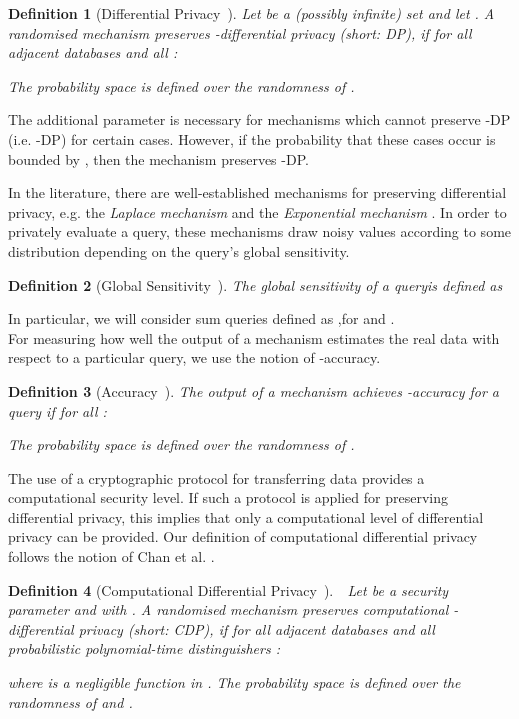 \documentclass[10pt]{extarticle}
\newtheorem{Def}{Definition}
\begin{document}
\begin{Def}[Differential Privacy~\cite{8}]
Let  be a (possibly infinite) set and let . A randomised mechanism  preserves -differential privacy (short: \mbox{\upshape\sffamily DP}), if for all adjacent databases  and all :

The probability space is defined over the randomness of .
\end{Def}

The additional parameter  is necessary for mechanisms which cannot preserve -\mbox{\upshape\sffamily DP} (i.e. -\mbox{\upshape\sffamily DP}) for certain cases. However, if the probability that these cases occur is bounded by , then the mechanism preserves -\mbox{\upshape\sffamily DP}.

In the literature, there are well-established mechanisms for preserving differential privacy, e.g. the \textit{Laplace mechanism} \cite{8} and the \textit{Exponential mechanism} \cite{9}. In order to privately evaluate a query, these mechanisms draw noisy values according to some distribution depending on the query's global sensitivity.


\begin{Def}[Global Sensitivity~\cite{8}]
The global sensitivity  of a query\linebreak  is defined as

\end{Def}

In particular, we will consider sum queries  defined as ,\linebreak for  and .\\
For measuring how well the output of a mechanism estimates the real data with respect to a particular query, we use the notion of -accuracy.

\begin{Def}[Accuracy~\cite{17}]
The output of a mechanism  achieves -accuracy for a query  if for all :

The probability space is defined over the randomness of .
\end{Def}

The use of a cryptographic protocol for transferring data provides a computational security level. If such a protocol is applied for preserving differential privacy, this implies that only a computational level of differential privacy can be provided. Our definition of computational differential privacy follows the notion of Chan et al. \cite{3}.

\begin{Def}[Computational Differential Privacy~\cite{3}] 
\mbox{\,\,} Let  be a security parameter and  with . A randomised mechanism  preserves computational -differential privacy (short: \mbox{\upshape\sffamily CDP}), if for all adjacent databases  and all probabilistic polynomial-time distinguishers :

where  is a negligible function in . The probability space is defined over the randomness of  and .
\end{Def}
\end{document}
